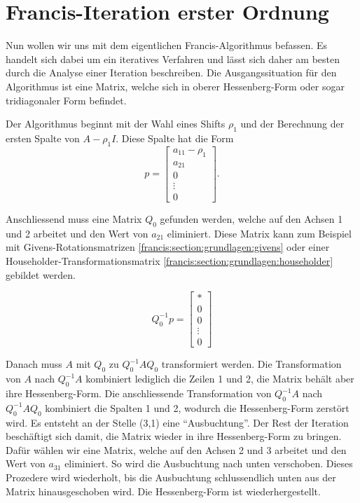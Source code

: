 \section{Francis-Iteration erster Ordnung\label{francis:section:francis_iteration}}
%

Nun wollen wir uns mit dem eigentlichen Francis-Algorithmus \cite{francis:watkins_book} befassen.
Es handelt sich dabei um ein iteratives Verfahren und lässt sich daher am besten durch die Analyse einer Iteration beschreiben.
Die Ausgangssituation für den Algorithmus ist eine Matrix, welche sich in oberer Hessenberg-Form oder sogar tridiagonaler Form befindet.

Der Algorithmus beginnt mit der Wahl eines Shifts $\rho_{1}$ und der Berechnung der ersten Spalte von $A-\rho_{1} I$. 
%
Diese Spalte hat die Form
\begin{equation}
	p=\begin{bmatrix}
	a_{11}-\rho_{1}\\
	a_{21}\\
	0\\
	\vdots\\
	0
	\end{bmatrix}.
\end{equation}

Anschliessend muss eine Matrix $Q_{0}$ gefunden werden, welche auf den Achsen 1 und 2 arbeitet und den Wert von $a_{21}$ eliminiert. Diese Matrix kann zum Beispiel mit Givens-Rotationsmatrizen \ref{francis:section:grundlagen:givens} oder einer Householder-Transformationsmatrix \ref{francis:section:grundlagen:householder} gebildet werden.

\begin{equation}
	Q_{0}^{-1}p=\begin{bmatrix}
	*\\
	0\\
	0\\
	\vdots\\
	0
	\end{bmatrix}
\end{equation}

Danach muss $A$ mit $Q_{0}$ zu  $Q_{0}^{-1}AQ_{0}$ transformiert werden.
Die Transformation von $A$ nach $Q_{0}^{-1}A$ kombiniert lediglich die Zeilen 1 und 2, die Matrix behält aber ihre Hessenberg-Form.
Die anschliessende Transformation von $Q_{0}^{-1}A$ nach $Q_{0}^{-1}AQ_{0}$ kombiniert die Spalten 1 und 2, wodurch die Hessenberg-Form zerstört wird.
Es entsteht an der Stelle (3,1) eine ``Ausbuchtung''.
%
Der Rest der Iteration beschäftigt sich damit, die Matrix wieder in ihre Hessenberg-Form zu bringen.
Dafür wählen wir eine Matrix, welche auf den Achsen 2 und 3 arbeitet und den Wert von $a_{31}$ eliminiert.
So wird die Ausbuchtung nach unten verschoben.
Dieses Prozedere wird wiederholt, bis die Ausbuchtung schlussendlich unten aus der Matrix hinausgeschoben wird.
Die Hessenberg-Form ist wiederhergestellt.

